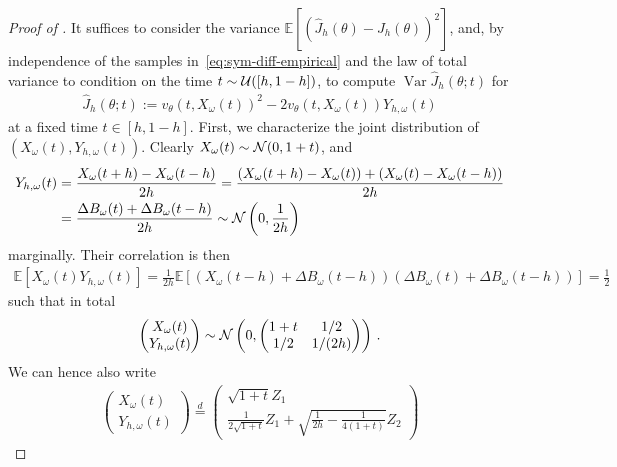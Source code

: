\documentclass[oneside,11pt]{article}
\theoremstyle{remark}
\begin{document}
\begin{proof}[Proof of ]
    It suffices to consider the variance $\mathbb{E}\left[(\widehat{J}_h(\theta) - J_h(\theta))^2\right]$, and, by independence of the samples in~\eqref{eq:sym-diff-empirical} and the law of total variance to condition on the time $t \sim {\cal U}([h, 1 - h])$, to compute $\operatorname{Var}\widehat{J}_h(\theta; t)$ for
    \begin{align}
    \widehat{J}_h(\theta;t) := v_\theta(t, X_\omega(t))^2 - 2 v_\theta(t, X_\omega(t)) Y_{h,\omega}(t)
    \label{eq:objective-bm}
\end{align}
at a fixed time $t \in [h, 1-h]$. First, we characterize the joint distribution of $(X_\omega(t), Y_{h,\omega}(t))$. Clearly $X_\omega(t) \sim {\cal N}(0,1+t)$, and
\begin{align*}
    Y_{h,\omega}(t) &= \frac{X_\omega(t+h) - X_\omega(t-h)}{2h} = \frac{(X_\omega(t+h)-X_\omega(t)) + (X_\omega(t)-X_\omega({t-h}))}{2h} \\
    &= \frac{\Delta B_\omega(t) + \Delta B_\omega(t-h)}{2 h} \sim {\cal N}\left(0,\frac{1}{2h}\right)
\end{align*}
marginally. Their correlation is then
\begin{align*}
    \mathbb{E} \left[X_\omega(t) Y_{h,\omega}(t) \right] = \frac{1}{2h} \mathbb{E} \left[ \left(X_\omega(t-h) + \Delta B_\omega(t-h) \right) \left(\Delta B_\omega(t) + \Delta B_\omega(t-h) \right) \right] = \frac{1}{2}
\end{align*}
such that in total
\begin{align*}
    \begin{pmatrix}
        X_\omega(t)\\ Y_{h,\omega}(t)
    \end{pmatrix} \sim {\cal N} \left(0, \begin{pmatrix}
        1+t & 1/2\\
        1/2 & 1/(2h)
    \end{pmatrix} \right)\,.
\end{align*}
We can hence also write
\begin{align}
    \begin{pmatrix}
        X_\omega(t) \\ Y_{h,\omega}(t)
    \end{pmatrix} \overset{d}{=} \begin{pmatrix}
        \sqrt{1+t} Z_1 \\
        \frac{1}{2 \sqrt{1+t}} Z_1 + \sqrt{\frac{1}{2h} - \frac{1}{4(1+t)}} Z_2

\end{pmatrix}
\end{align}
\end{proof}
\end{document}
